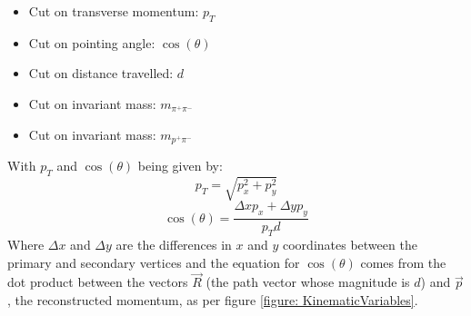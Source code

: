 \documentclass{article}
\begin{document}
\begin{itemize}
    \item Cut on transverse momentum: $p_T$
    \item Cut on pointing angle: $\cos(\theta)$ 
    \item Cut on distance travelled: $d$
    \item Cut on invariant mass: $m_{\pi^+\pi^-}$
    \item Cut on invariant mass: $m_{p^+\pi^-}$
\end{itemize}

With $p_T$ and $\cos(\theta)$ being given by:
\begin{equation}
    p_T = \sqrt{p_x^2 + p_y^2}
\end{equation}
\begin{equation}
    \cos(\theta) = \frac{\Delta x p_x + \Delta y p_y}{p_Td}
\end{equation}
Where $\Delta x$ and $\Delta y$ are the differences in $x$ and $y$ coordinates between the primary 
and secondary vertices and the equation for $\cos(\theta)$ comes from the dot product between the 
vectors $\vec{R}$ (the path vector whose magnitude is $d$) and $\vec{p}$, the reconstructed momentum, 
as per figure \ref{figure: KinematicVariables}.


  
 
\end{document}
